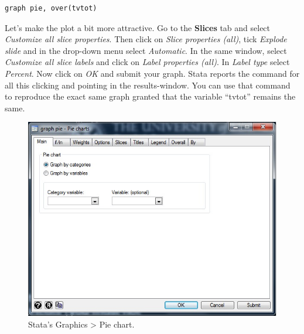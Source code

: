 \documentclass{article}
\begin{document}
\begin{lstlisting}
graph pie, over(tvtot)
\end{lstlisting}

Let's make the plot a bit more attractive. Go to the \textbf{Slices} tab and select \textit{Customize all slice properties}. Then click on \textit{Slice properties (all)}, tick \textit{Explode slide} and in the drop-down menu select \textit{Automatic}. In the same window, select \textit{Customize all slice labels} and click on \textit{Label properties (all)}. In \textit{Label type} select \textit{Percent}. Now click on \textit{OK} and submit your graph. Stata reports the command for all this clicking and pointing in the results-window. You can use that command to reproduce the exact same graph granted that the variable ``tvtot'' remains the same.

\begin{figure}[H]
	\includegraphics[width=\linewidth]{../img/graphics_pie.jpg}
	\caption{Stata's Graphics > Pie chart.}
\end{figure}
\end{document}
